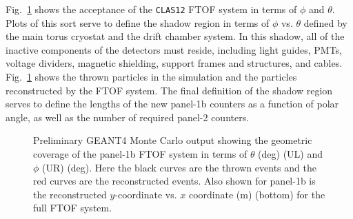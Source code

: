 Fig.~\ref{ftof_acc} shows the acceptance of the {\tt CLAS12} FTOF system
in terms of $\phi$ and $\theta$.  Plots of this sort serve to define the 
shadow region in terms of $\phi$ vs. $\theta$ defined by the main torus 
cryostat and the drift chamber system.  In this shadow, all of the inactive 
components of the detectors must reside, including light guides, PMTs, 
voltage dividers, magnetic shielding, support frames and structures, and 
cables.  Fig.~\ref{ftof_acc} shows the thrown particles in the simulation
and the particles reconstructed by the FTOF system.  The final definition 
of the shadow region serves to define the lengths of the new panel-1b 
counters as a function of polar angle, as well as the number of required
panel-2 counters.

\begin{figure}[htbp]
\vspace{14.0cm}
\caption{\small{Preliminary GEANT4 Monte Carlo output showing the 
geometric coverage of the panel-1b FTOF system in terms of $\theta$ (deg) 
(UL) and $\phi$ (UR) (deg).  Here the black curves are the thrown events 
and the red curves are the reconstructed events.  Also shown for panel-1b
is the reconstructed $y$-coordinate vs. $x$ coordinate (m) (bottom) for the 
full FTOF system.}}
\label{ftof_acc}
\end{figure}

